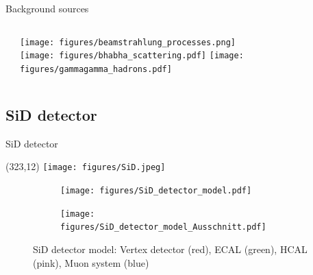 \documentclass[xcolor={dvipsnames}]{beamer}
\newcommand{\sidlogo}{
  \setlength{\TPHorizModule}{1pt}
  \setlength{\TPVertModule}{1pt}
  \begin{textblock}{1}(323,12)
   \texttt{[image: figures/SiD.jpeg]}
  \end{textblock}
  }
\begin{document}
\begin{frame}{Background sources}
\begin{columns}
\begin{column}{0.55\textwidth}
{  }
 \end{column}
 \begin{column}{0.45\textwidth}
 \texttt{[image: figures/beamstrahlung\_processes.png]}\\
 \texttt{[image: figures/bhabha\_scattering.pdf]} 
 \texttt{[image: figures/gammagamma\_hadrons.pdf]}
 \end{column}
\end{columns}

\end{frame}

\subsection{SiD detector}
\begin{frame}{SiD detector}
\sidlogo
\begin{figure}[T]
\centering
\begin{subfigure}[b]{0.49\textwidth}
\centering
\texttt{[image: figures/SiD\_detector\_model.pdf]}
\end{subfigure}
\begin{subfigure}[b]{0.49\textwidth}
\centering
\texttt{[image: figures/SiD\_detector\_model\_Ausschnitt.pdf]}
\end{subfigure}
\caption{\small SiD detector model: Vertex detector (red), ECAL (green), HCAL (pink), Muon system (blue)}
\end{figure}
\end{frame}
\end{document}
